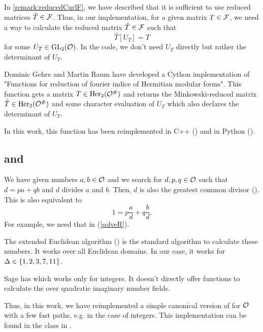 \subsection{}
\label{impl:reduceGL}
In \cref{remark:reducedCurlF}, we have described that it is sufficient to use reduced matrices $\hat{T} \in \mathcal{F}$. Thus, in our implementation, for a given matrix $T \in \mathcal{F}$, we need a way to calculate the reduced matrix $\hat{T} \in \mathcal{F}$ such that
\[ \hat{T}[U_T] = T \]
for some $U_T \in \operatorname{GL}_2(\mathcal{O})$. In the code, we don't need $U_T$ directly but rather the determinant of $U_T$.

Dominic Gehre and Martin Raum have developed a Cython implementation \cite{Raum09reduceGL} of "Functions for reduction of fourier indice of Hermitian modular forms". This function  gets a matrix $T \in \operatorname{Her}_2(\mathcal{O}^\#)$ and returns the Minkowski-reduced matrix $\hat{T} \in \operatorname{Her}_2(\mathcal{O}^\#)$ and some character evaluation of $U_T$ which also declares the determinant of $U_T$.

In this work, this function  has been reimplemented in C++ () and in Python ().


\subsection{ and }

We have given numbers $a,b \in \mathcal{O}$ and we search for $d,p,q \in \mathcal{O}$ such that $d = pa + qb$ and $d$ divides $a$ and $b$. Then, $d$ is also the greatest common divisor (). This is also equivalent to
\[ 1 = p \frac{a}{d} + q \frac{b}{d} . \]
%
For example, we need that in  (\cref{solveR}).

The extended Euclidean algorithm () is the standard algorithm to calculate these numbers. It works over all Euclidean domains. In our case, it works for $\Delta \in \Set{1, 2, 3, 7, 11}$.

Sage has  which works only for integers. It doesn't directly offer functions to calculate the  over quadratic imaginary number fields.

Thus, in this work, we have reimplemented a simple canonical version of  for $\mathcal{O}$ with a few fast paths, e.g. in the case of integers. This implementation can be found in the class  in .


